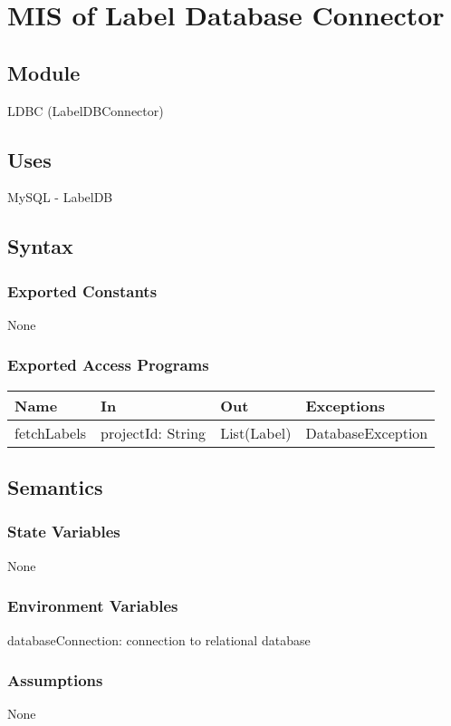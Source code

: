 \documentclass[12pt, titlepage]{article}
\begin{document}
\section{MIS of Label Database Connector} \label{ldbc} 
\subsection{Module}
    LDBC (LabelDBConnector)

\subsection{Uses}
    MySQL - LabelDB

\subsection{Syntax}
\subsubsection{Exported Constants}
    None

\subsubsection{Exported Access Programs}
\begin{center}\begin{tabular}{p{3cm} p{4cm} p{3cm} p{3cm}}
\hline\textbf{Name} & \textbf{In} & \textbf{Out} & \textbf{Exceptions} \\
\hline
    fetchLabels & projectId: String & List(Label) & DatabaseException \\
\hline
\end{tabular}\end{center}

\subsection{Semantics}
\subsubsection{State Variables}
    None

\subsubsection{Environment Variables}
    databaseConnection: connection to relational database

\subsubsection{Assumptions}
    None
\end{document}
